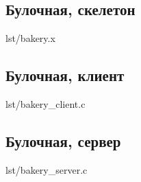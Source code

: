\newpage

\subsection{Булочная, скелетон}

\begin{lstinputlisting}[
        label={lst:},
        caption={}
    ]{lst/bakery.x}
\end{lstinputlisting}

\newpage

\subsection{Булочная, клиент}

\begin{lstinputlisting}[
        label={lst:},
        caption={}
    ]{lst/bakery_client.c}
\end{lstinputlisting}

\newpage

\subsection{Булочная, сервер}

\begin{lstinputlisting}[
        label={lst:},
        caption={}
    ]{lst/bakery_server.c}
\end{lstinputlisting}
